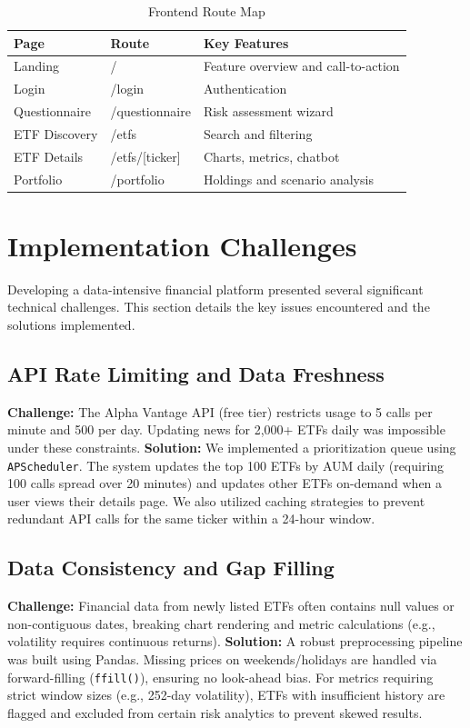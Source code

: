 \begin{table}[H]
\centering
\label{tab:frontend_routes}
\begin{tabular}{lll}
\toprule
\textbf{Page} & \textbf{Route} & \textbf{Key Features} \\
\midrule
Landing & / & Feature overview and call-to-action \\
Login & /login & Authentication \\
Questionnaire & /questionnaire & Risk assessment wizard \\
ETF Discovery & /etfs & Search and filtering \\
ETF Details & /etfs/[ticker] & Charts, metrics, chatbot \\
Portfolio & /portfolio & Holdings and scenario analysis \\
\bottomrule
\end{tabular}
\caption{Frontend Route Map}
\end{table}


\section{Implementation Challenges}

Developing a data-intensive financial platform presented several significant technical challenges. This section details the key issues encountered and the solutions implemented.

\subsection{API Rate Limiting and Data Freshness}
\textbf{Challenge:} The Alpha Vantage API (free tier) restricts usage to 5 calls per minute and 500 per day. Updating news for 2,000+ ETFs daily was impossible under these constraints.
\textbf{Solution:} We implemented a prioritization queue using \texttt{APScheduler}. The system updates the top 100 ETFs by AUM daily (requiring 100 calls spread over 20 minutes) and updates other ETFs on-demand when a user views their details page. We also utilized caching strategies to prevent redundant API calls for the same ticker within a 24-hour window.

\subsection{Data Consistency and Gap Filling}
\textbf{Challenge:} Financial data from newly listed ETFs often contains null values or non-contiguous dates, breaking chart rendering and metric calculations (e.g., volatility requires continuous returns).
\textbf{Solution:} A robust preprocessing pipeline was built using Pandas. Missing prices on weekends/holidays are handled via forward-filling (\texttt{ffill()}), ensuring no look-ahead bias. For metrics requiring strict window sizes (e.g., 252-day volatility), ETFs with insufficient history are flagged and excluded from certain risk analytics to prevent skewed results.


